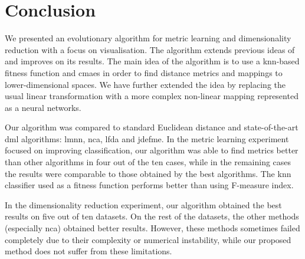 \documentclass[12pt,a4paper]{report}
\begin{document}








\chapter{Conclusion} \label{chap:conclusion}

We presented an evolutionary algorithm for metric learning and dimensionality reduction with a focus on visualisation. The algorithm extends previous ideas of~\citep{fukui2013evolutionary} and improves on its results. The main idea of the algorithm is to use a \ac{knn}-based fitness function and \ac{cmaes} in order to find distance metrics and mappings to lower-dimensional spaces. We have further extended the idea by replacing the usual linear transformation with a more complex non-linear mapping represented as a neural networks.

Our algorithm was compared to standard Euclidean distance and state-of-the-art \ac{dml} algorithms: \ac{lmnn}, \ac{nca}, \ac{lfda} and \ac{jdefme}. In the metric learning experiment focused on improving classification, our algorithm was able to find metrics better than other algorithms in four out of the ten cases, while in the remaining cases the results were comparable to those obtained by the best algorithms. The \ac{knn} classifier used as a fitness function performs better than using F-measure index.

In the dimensionality reduction experiment, our algorithm obtained the best results on five out of ten datasets. On the rest of the datasets, the other methods (especially \ac{nca}) obtained better results. However, these methods sometimes failed completely due to their complexity or numerical instability, while our proposed method does not suffer from these limitations.
\end{document}

